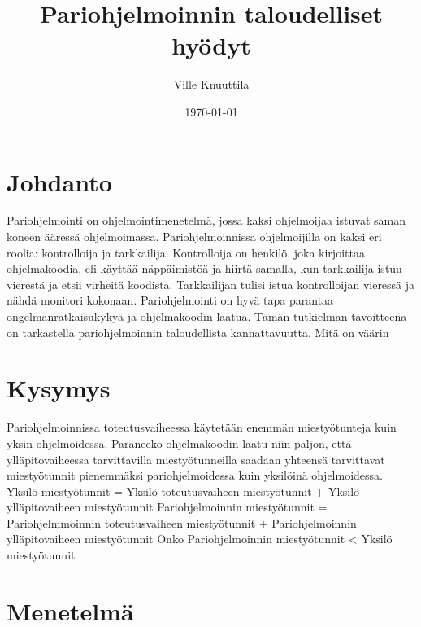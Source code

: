 \documentclass[finnish]{tktltiki2}
\title{Pariohjelmoinnin taloudelliset hyödyt}
\author{Ville Knuuttila}
\date{\today}
\theoremstyle{definition}
\theoremstyle{remark}
\begin{document}

\maketitle        %
\makeabstract     %

\tableofcontents  %
\newpage          %



\section{Johdanto}
Pariohjelmointi on ohjelmointimenetelmä, jossa kaksi ohjelmoijaa istuvat saman koneen ääressä ohjelmoimassa. Pariohjelmoinnissa ohjelmoijilla on kaksi eri roolia: kontrolloija ja tarkkailija. Kontrolloija on henkilö, joka kirjoittaa ohjelmakoodia, eli käyttää näppäimistöä ja hiirtä samalla, kun tarkkailija istuu vierestä ja etsii virheitä koodista. Tarkkailijan tulisi istua kontrolloijan vieressä ja nähdä monitori kokonaan. \cite{pairprogramming2} 
\newline
Pariohjelmointi on hyvä tapa parantaa ongelmanratkaisukykyä ja ohjelmakoodin laatua.\cite{pairprogramming} Tämän tutkielman tavoitteena on tarkastella pariohjelmoinnin taloudellista kannattavuutta.
Mitä on väärin~\cite{meta}

\section{Kysymys}
Pariohjelmoinnissa toteutusvaiheessa käytetään enemmän miestyötunteja kuin yksin ohjelmoidessa.\cite{costandbenefit2} Paraneeko ohjelmakoodin laatu niin paljon, että ylläpitovaiheessa tarvittavilla miestyötunneilla saadaan yhteensä tarvittavat miestyötunnit pienemmäksi pariohjelmoidessa kuin yksilöinä ohjelmoidessa.\newline
Yksilö miestyötunnit = Yksilö toteutusvaiheen miestyötunnit + Yksilö ylläpitovaiheen miestyötunnit\newline
Pariohjelmoinnin miestyötunnit = Pariohjelmmoinnin toteutusvaiheen miestyötunnit + Pariohjelmoinnin ylläpitovaiheen miestyötunnit\newline
Onko Pariohjelmoinnin miestyötunnit < Yksilö miestyötunnit
\section{Menetelmä}
\end{document}
